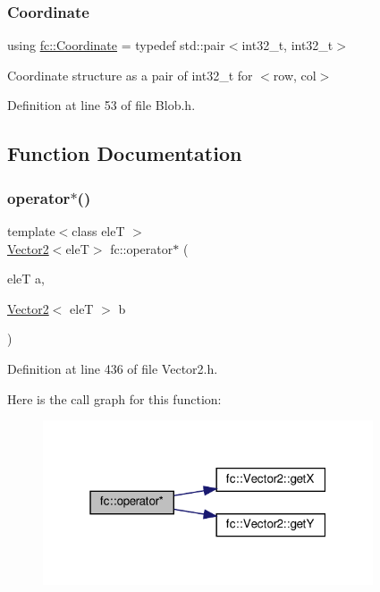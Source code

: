 \subsubsection{\texorpdfstring{Coordinate}{Coordinate}}
{\footnotesize\ttfamily using \hyperlink{namespacefc_a7da125cb1e99553c27c07139ee8a62ca}{fc\+::\+Coordinate} = typedef std\+::pair$<$int32\+\_\+t, int32\+\_\+t$>$}



Coordinate structure as a pair of int32\+\_\+t for $<$row, col$>$ 



Definition at line 53 of file Blob.\+h.



\subsection{Function Documentation}
\mbox{\label{namespacefc_a29cd1b829e901810afd80ee5f75cdcc2}} 
\subsubsection{\texorpdfstring{operator$\ast$()}{operator*()}}
{\footnotesize\ttfamily template$<$class eleT $>$ \\
\hyperlink{classfc_1_1Vector2}{Vector2}$<$eleT$>$ fc\+::operator$\ast$ (\begin{DoxyParamCaption}\item[{eleT}]{a,  }\item[{\hyperlink{classfc_1_1Vector2}{Vector2}$<$ eleT $>$}]{b }\end{DoxyParamCaption})}



Definition at line 436 of file Vector2.\+h.

Here is the call graph for this function\+:
\nopagebreak
\begin{figure}[H]
\begin{center}
\leavevmode
\includegraphics[width=277pt]{d2/db4/namespacefc_a29cd1b829e901810afd80ee5f75cdcc2_cgraph}
\end{center}
\end{figure}
\mbox{\label{namespacefc_a54dd7df4c8a01e800426c7aefe3b349b}} 
